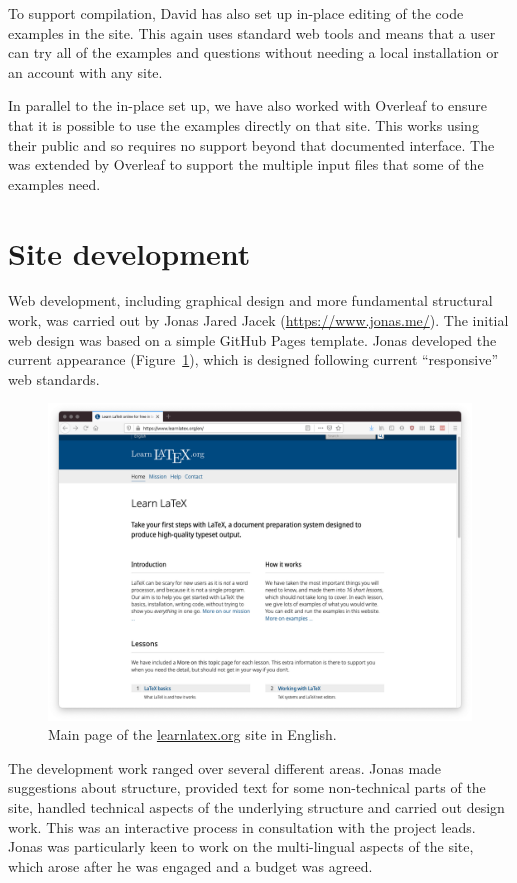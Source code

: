 \documentclass[a4paper]{article}
\begin{document}
To support compilation, David has also set up in-place editing of the code
examples in the site. This again uses standard web tools and means that a user
can try all of the examples and questions without needing a local installation
or an account with any site.

In parallel to the in-place set up, we have also worked with Overleaf to ensure
that it is possible to use the examples directly on that site. This works using
their public  and so requires no support beyond that documented
interface. The  was extended by Overleaf to support the multiple
input files that some of the examples need. 

\section{Site development}

Web development, including graphical design and more fundamental structural
work, was carried out by Jonas Jared Jacek (\url{https://www.jonas.me/}). The
initial web design was based on a simple GitHub Pages template. Jonas developed
the current appearance (Figure~\ref{fgr:site}), which is designed following
current \enquote{responsive} web standards.
\begin{figure}
  \includegraphics[width = \textwidth]{learnlatex-screenshot}
  \caption{Main page of the \url{learnlatex.org} site in English.\label{fgr:site}}
\end{figure}

The development work ranged over several different areas. Jonas made
suggestions about structure, provided text for some non-technical parts of the
site, handled technical aspects of the underlying structure and carried out
design work. This was an interactive process in consultation with the project
leads. Jonas was particularly keen to work on the multi-lingual aspects of
the site, which arose after he was engaged and a budget was agreed.
\end{document}
